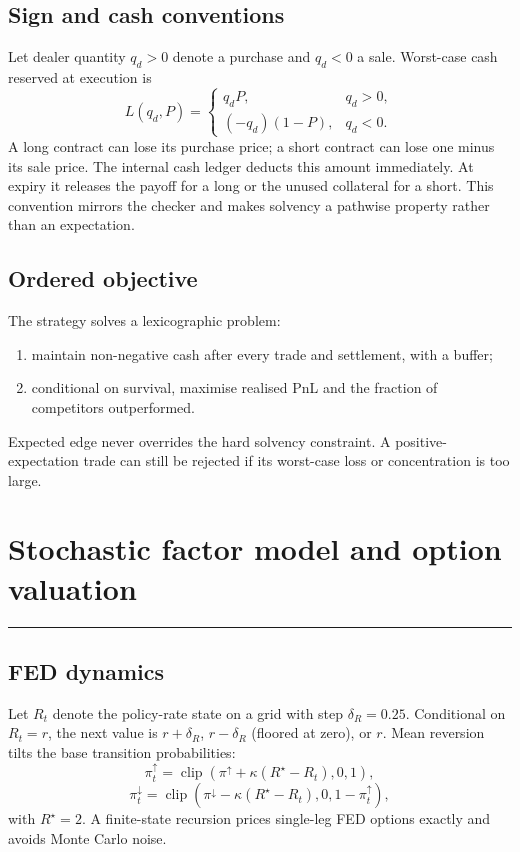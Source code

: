 \documentclass[10pt,a4paper]{article}
\newcommand{\clip}{\operatorname{clip}}
\newcommand{\1}{\mathbf{1}}
\newcommand{\sectionrule}{\vspace{-2pt}\noindent\color{navy}\rule{\textwidth}{0.7pt}\color{black}\vspace{2pt}}
\begin{document}
\subsection{Sign and cash conventions}
Let dealer quantity $q_d>0$ denote a purchase and $q_d<0$ a sale.  Worst-case cash
reserved at execution is
\[
 L(q_d,P)=
 \begin{cases}
 q_dP,&q_d>0,\\
 (-q_d)(1-P),&q_d<0.
 \end{cases}
\]
A long contract can lose its purchase price; a short contract can lose one minus its
sale price.  The internal cash ledger deducts this amount immediately.  At expiry it
releases the payoff for a long or the unused collateral for a short.  This convention
mirrors the checker and makes solvency a pathwise property rather than an expectation.

\subsection{Ordered objective}
The strategy solves a lexicographic problem:
\begin{enumerate}
  \item maintain non-negative cash after every trade and settlement, with a buffer;
  \item conditional on survival, maximise realised PnL and the fraction of competitors
  outperformed.
\end{enumerate}
Expected edge never overrides the hard solvency constraint.  A positive-expectation
trade can still be rejected if its worst-case loss or concentration is too large.

\clearpage

\section{Stochastic factor model and option valuation}
\sectionrule

\subsection{FED dynamics}
Let $R_t$ denote the policy-rate state on a grid with step $\delta_R=0.25$.  Conditional
on $R_t=r$, the next value is $r+\delta_R$, $r-\delta_R$ (floored at zero), or $r$.
Mean reversion tilts the base transition probabilities:
\[
 \pi_t^{\uparrow}=\clip\!\left(\pi^{\uparrow}+\kappa(R^\star-R_t),0,1\right),
\]
\[
 \pi_t^{\downarrow}=\clip\!\left(\pi^{\downarrow}-\kappa(R^\star-R_t),
 0,1-\pi_t^{\uparrow}\right),
\]
with $R^\star=2$.  A finite-state recursion prices single-leg FED options exactly and
avoids Monte Carlo noise.
\end{document}

